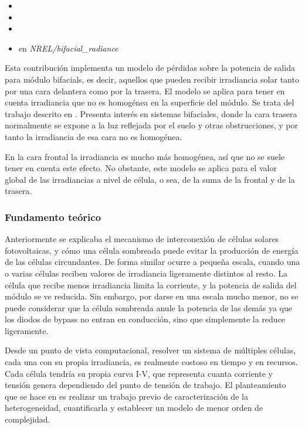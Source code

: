 \begin{itemize}
    \item {}
    \item {}
    \item {}
    \item {} en \textit{NREL/bifacial\_radiance}
\end{itemize}

Esta contribución implementa un modelo de pérdidas sobre la potencia de salida para \glspl{módulo bifacial}, es decir, aquellos que pueden recibir \gls{irradiancia} solar tanto por una cara delantera como por la trasera. El modelo se aplica para tener en cuenta irradiancia que no es homogénea en la superficie del \gls{módulo}. Se trata del trabajo descrito en \cite{Deline_Ayala_Pelaez_MacAlpine_Olalla_2020}.
Presenta interés en sistemas bifaciales, donde la cara trasera normalmente se expone a la luz \gls{reflejada} por el suelo y otras obstrucciones, y por tanto la irradiancia de esa cara no es homogénea.

En la cara frontal la irradiancia es mucho más homogénea, así que no se suele tener en cuenta este efecto. No obstante, este modelo se aplica para el valor global de las irradiancias a nivel de célula, o sea, de la suma de la frontal y de la trasera.

\subsubsection{Fundamento teórico}

Anteriormente se explicaba el mecanismo de interconexión de células solares fotovoltaicas, y cómo una célula sombreada puede evitar la producción de energía de las células circundantes. De forma similar ocurre a pequeña escala, cuando una o varias células reciben valores de irradiancia ligeramente distintos al resto. La célula que recibe menos irradiancia limita la corriente, y la potencia de salida del módulo se ve reducida. Sin embargo, por darse en una escala mucho menor, no se puede considerar que la célula sombreada anule la potencia de las demás ya que los \gls{diodos de bypass} no entran en conducción, sino que simplemente la reduce ligeramente.

Desde un punto de vista computacional, resolver un sistema de múltiples células, cada una con su propia irradiancia, es realmente costoso en tiempo y en recursos. Cada célula tendría su propia curva I-V, que representa cuanta corriente y tensión genera dependiendo del punto de tensión de trabajo. El planteamiento que se hace en \cite{Deline_Ayala_Pelaez_MacAlpine_Olalla_2020} es realizar un trabajo previo de caracterización de la heterogeneidad, cuantificarla y establecer un modelo de menor orden de complejidad.

